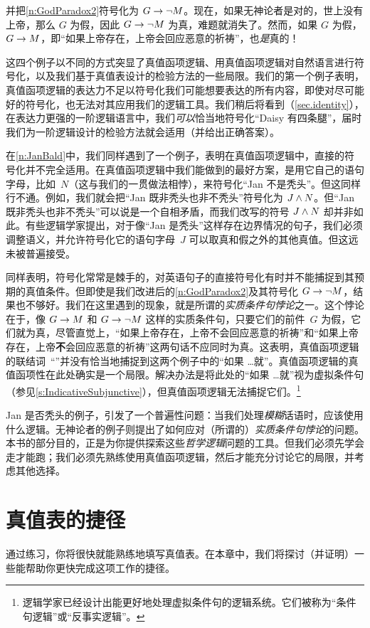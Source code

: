 并把\cref*{n:GodParadox2}符号化为 $G \rightarrow \neg M$。现在，如果无神论者是对的，世上没有上帝，那么 $G$ 为假，因此 $G \rightarrow \neg M$ 为真，难题就消失了。然而，如果 $G$ 为假，$G \rightarrow M$，即“如果上帝存在，上帝会回应恶意的祈祷”，也\emph{是}真的！

这四个例子以不同的方式突显了真值函项逻辑、用真值函项逻辑对自然语言进行符号化，以及我们基于真值表设计的检验方法的一些局限。我们的第一个例子表明，真值函项逻辑的表达力不足以符号化我们可能想要表达的所有内容，即使对尽可能好的符号化，也无法对其应用我们的逻辑工具。我们稍后将看到（\cref{sec.identity}），在表达力更强的一阶逻辑语言中，我们\emph{可以}恰当地符号化“Daisy 有四条腿”，届时我们为一阶逻辑设计的检验方法就会适用（并给出正确答案）。

在\cref{n:JanBald}中，我们同样遇到了一个例子，表明在真值函项逻辑中，直接的符号化并不完全适用。在真值函项逻辑中我们能做到的最好方案，是用它自己的语句字母，比如~$N$（这与我们的一贯做法相悖），来符号化“Jan 不是秃头”。但这同样行不通。例如，我们就会把“Jan 既非秃头也非不秃头”符号化为 $J \wedge N$。但“Jan 既非秃头也非不秃头”可以说是一个自相矛盾，而我们改写的符号 $J \wedge N$ 却并非如此。有些逻辑学家提出，对于像“Jan 是秃头”这样存在边界情况的句子，我们必须调整语义，并允许符号化它的语句字母~$J$ 可以取真和假之外的其他真值。但这远未被普遍接受。

同样表明，符号化常常是棘手的，对英语句子的直接符号化有时并不能捕捉到其预期的真值条件。但即使是我们改进后的\cref{n:GodParadox2}及其符号化 $G \rightarrow \neg M$，结果也不够好。我们在这里遇到的现象，就是所谓的\emph{实质条件句悖论}之一。这个悖论在于，像 $G \rightarrow M$ 和 $G \rightarrow \neg M$ 这样的实质条件句，只要它们的前件~$G$ 为假，它们就为真，尽管直觉上，“如果上帝存在，上帝不会回应恶意的祈祷”和“如果上帝存在，上帝\textbf{不}会回应恶意的祈祷”这两句话不应同时为真。这表明，真值函项逻辑的联结词~“\eif”并没有恰当地捕捉到这两个例子中的“如果 \dots 就”。真值函项逻辑的真值函项性在此处确实是一个局限。解决办法是将此处的“如果 \dots 就”视为虚拟条件句（参见\cref{s:IndicativeSubjunctive}），但真值函项逻辑无法捕捉它们。\footnote{逻辑学家已经设计出能更好地处理虚拟条件句的逻辑系统。它们被称为“条件句逻辑”或“反事实逻辑”。}

Jan 是否秃头的例子，引发了一个普遍性问题：当我们处理\emph{模糊}话语时，应该使用什么逻辑。无神论者的例子则提出了如何应对（所谓的）\emph{实质条件句悖论}的问题。本书的部分目的，正是为你提供探索这些\emph{哲学逻辑}问题的工具。但我们必须先学会走才能跑；我们必须先熟练使用真值函项逻辑，然后才能充分讨论它的局限，并考虑其他选择。

\chapter{真值表的捷径}
通过练习，你将很快就能熟练地填写真值表。在本章中，我们将探讨（并证明）一些能帮助你更快完成这项工作的捷径。

